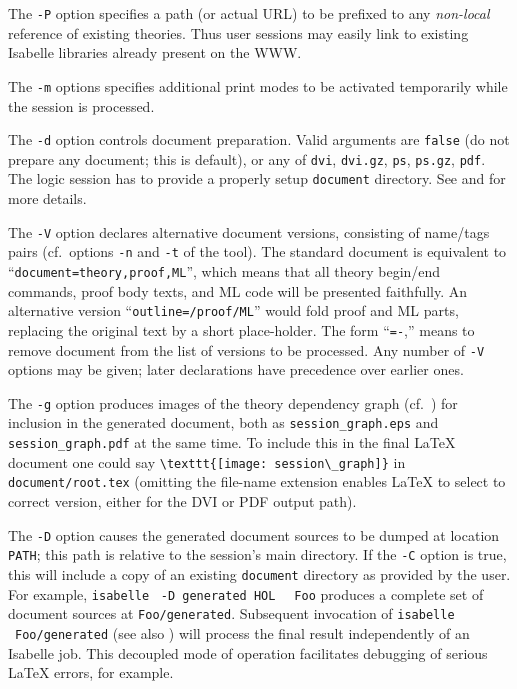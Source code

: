 \begin{isabellebody}
\begin{isamarkuptext}
  The \verb|-P| option specifies a path (or actual URL) to be
  prefixed to any \emph{non-local} reference of existing theories.
  Thus user sessions may easily link to existing Isabelle libraries
  already present on the WWW.

  The \verb|-m| options specifies additional print modes to be
  activated temporarily while the session is processed.

  \medskip The \verb|-d| option controls document preparation.
  Valid arguments are \verb|false| (do not prepare any document;
  this is default), or any of \verb|dvi|, \verb|dvi.gz|,
  \verb|ps|, \verb|ps.gz|, \verb|pdf|.  The logic
  session has to provide a properly setup \verb|document|
  directory.  See  and
   for more details.

  \medskip The \verb|-V| option declares alternative document
  versions, consisting of name/tags pairs (cf.\ options \verb|-n| and \verb|-t| of the \hyperlink{tool.document}{\mbox{}} tool).  The
  standard document is equivalent to ``\verb|document=theory,proof,ML|'', which means that all theory begin/end
  commands, proof body texts, and ML code will be presented
  faithfully.  An alternative version ``\verb|outline=/proof/ML|'' would fold proof and ML parts, replacing the
  original text by a short place-holder.  The form ``\verb|=-|,'' means to remove document  from
  the list of versions to be processed.  Any number of \verb|-V| options may be given; later declarations have precedence over
  earlier ones.

  \medskip The \verb|-g| option produces images of the theory
  dependency graph (cf.\ ) for inclusion in the
  generated document, both as \verb|session_graph.eps| and
  \verb|session_graph.pdf| at the same time.  To include this in
  the final {\LaTeX} document one could say \verb|\texttt{[image: session\_graph]}| in \verb|document/root.tex| (omitting the file-name extension enables
  {\LaTeX} to select to correct version, either for the DVI or PDF
  output path).

  \medskip The \verb|-D| option causes the generated document
  sources to be dumped at location \verb|PATH|; this path is
  relative to the session's main directory.  If the \verb|-C|
  option is true, this will include a copy of an existing \verb|document| directory as provided by the user.  For example,
  \verb|isabelle| \hyperlink{tool.usedir}{\mbox{}}~\verb|-D generated HOL|\isasep\isanewline%
\verb|  Foo| produces a complete set of document sources at \verb|Foo/generated|.  Subsequent invocation of \verb|isabelle| \hyperlink{tool.document}{\mbox{}}~\verb|Foo/generated| (see also
  ) will process the final result
  independently of an Isabelle job.  This decoupled mode of operation
  facilitates debugging of serious {\LaTeX} errors, for example.


\end{isamarkuptext}
\end{isabellebody}

